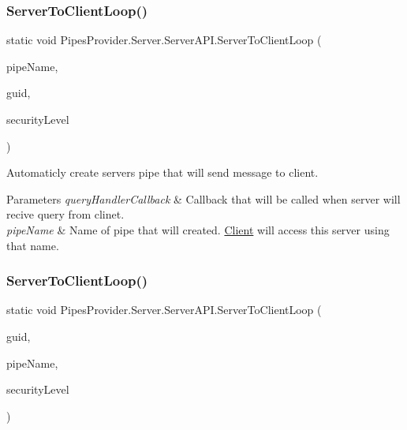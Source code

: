 \subsubsection{\texorpdfstring{Server\+To\+Client\+Loop()}{ServerToClientLoop()}\hspace{0.1cm}{\footnotesize\ttfamily [1/2]}}
{\footnotesize\ttfamily static void Pipes\+Provider.\+Server.\+Server\+A\+P\+I.\+Server\+To\+Client\+Loop (\begin{DoxyParamCaption}\item[{string}]{pipe\+Name,  }\item[{out string}]{guid,  }\item[{\mbox{\hyperlink{namespace_pipes_provider_1_1_security_a1a6020eca1c661a6f7140e8260502d7e}{Security.\+Security\+Level}}}]{security\+Level }\end{DoxyParamCaption})\hspace{0.3cm}{\ttfamily [static]}}



Automaticly create server\textquotesingle{}s pipe that will send message to client. 


\begin{DoxyParams}{Parameters}
{\em query\+Handler\+Callback} & Callback that will be called when server will recive query from clinet.\\
\hline
{\em pipe\+Name} & Name of pipe that will created. \mbox{\hyperlink{namespace_pipes_provider_1_1_client}{Client}} will access this server using that name.\\
\hline
\end{DoxyParams}
\mbox{\label{class_pipes_provider_1_1_server_1_1_server_a_p_i_a2e4ac901af731290f1065d08b982f32b}} 
\subsubsection{\texorpdfstring{Server\+To\+Client\+Loop()}{ServerToClientLoop()}\hspace{0.1cm}{\footnotesize\ttfamily [2/2]}}
{\footnotesize\ttfamily static void Pipes\+Provider.\+Server.\+Server\+A\+P\+I.\+Server\+To\+Client\+Loop (\begin{DoxyParamCaption}\item[{string}]{guid,  }\item[{string}]{pipe\+Name,  }\item[{\mbox{\hyperlink{namespace_pipes_provider_1_1_security_a1a6020eca1c661a6f7140e8260502d7e}{Security.\+Security\+Level}}}]{security\+Level }\end{DoxyParamCaption})\hspace{0.3cm}{\ttfamily [static]}}



